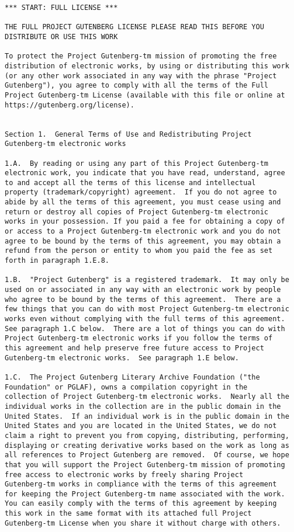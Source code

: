 \documentclass[letterpaper,12pt,oneside,openany]{memoir}
\begin{document}
\begin{verbatim}
*** START: FULL LICENSE ***

THE FULL PROJECT GUTENBERG LICENSE PLEASE READ THIS BEFORE YOU
DISTRIBUTE OR USE THIS WORK

To protect the Project Gutenberg-tm mission of promoting the free
distribution of electronic works, by using or distributing this work
(or any other work associated in any way with the phrase "Project
Gutenberg"), you agree to comply with all the terms of the Full
Project Gutenberg-tm License (available with this file or online at
https://gutenberg.org/license).


Section 1.  General Terms of Use and Redistributing Project
Gutenberg-tm electronic works

1.A.  By reading or using any part of this Project Gutenberg-tm
electronic work, you indicate that you have read, understand, agree
to and accept all the terms of this license and intellectual
property (trademark/copyright) agreement.  If you do not agree to
abide by all the terms of this agreement, you must cease using and
return or destroy all copies of Project Gutenberg-tm electronic
works in your possession. If you paid a fee for obtaining a copy of
or access to a Project Gutenberg-tm electronic work and you do not
agree to be bound by the terms of this agreement, you may obtain a
refund from the person or entity to whom you paid the fee as set
forth in paragraph 1.E.8.

1.B.  "Project Gutenberg" is a registered trademark.  It may only be
used on or associated in any way with an electronic work by people
who agree to be bound by the terms of this agreement.  There are a
few things that you can do with most Project Gutenberg-tm electronic
works even without complying with the full terms of this agreement.
See paragraph 1.C below.  There are a lot of things you can do with
Project Gutenberg-tm electronic works if you follow the terms of
this agreement and help preserve free future access to Project
Gutenberg-tm electronic works.  See paragraph 1.E below.

1.C.  The Project Gutenberg Literary Archive Foundation ("the
Foundation" or PGLAF), owns a compilation copyright in the
collection of Project Gutenberg-tm electronic works.  Nearly all the
individual works in the collection are in the public domain in the
United States.  If an individual work is in the public domain in the
United States and you are located in the United States, we do not
claim a right to prevent you from copying, distributing, performing,
displaying or creating derivative works based on the work as long as
all references to Project Gutenberg are removed.  Of course, we hope
that you will support the Project Gutenberg-tm mission of promoting
free access to electronic works by freely sharing Project
Gutenberg-tm works in compliance with the terms of this agreement
for keeping the Project Gutenberg-tm name associated with the work.
You can easily comply with the terms of this agreement by keeping
this work in the same format with its attached full Project
Gutenberg-tm License when you share it without charge with others.


\end{verbatim}
\end{document}
